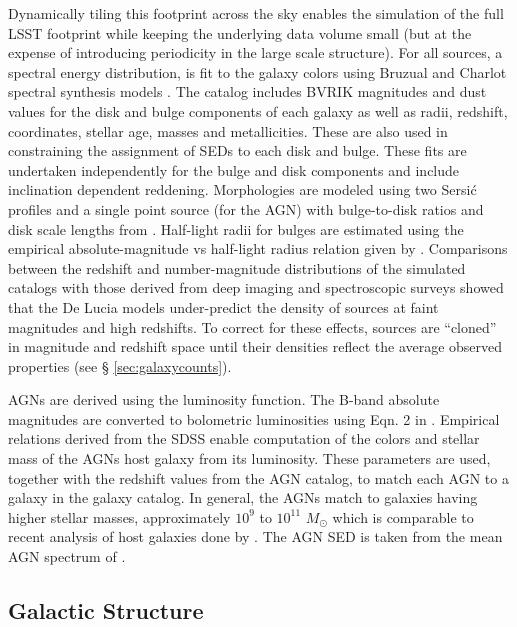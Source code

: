 \documentclass[]{article}
\begin{document}
Dynamically tiling this footprint across the sky enables the
simulation of the full LSST footprint while keeping the underlying
data volume small (but at the expense of introducing periodicity in
the large scale structure).  For all sources, a spectral energy
distribution, is fit to the galaxy colors using Bruzual and Charlot
spectral synthesis models \citep{bruzual}. The
\citet{delucia} catalog includes BVRIK magnitudes and dust values for
the disk and bulge components of each galaxy as well as radii,
redshift, coordinates, stellar age, masses and metallicities. These
are also used in constraining the assignment of SEDs to each disk and bulge.
These fits are undertaken independently for the bulge and disk components and
include inclination dependent reddening. Morphologies are modeled using two
Sersi{\'c} profiles and a single point source (for the AGN) with
bulge-to-disk ratios and disk scale lengths from \citet{delucia}.
 Half-light radii for bulges are estimated using the empirical
absolute-magnitude vs half-light radius relation given by 
\citet{gonzalez09}.  Comparisons between the redshift and
number-magnitude distributions of the simulated catalogs with those
derived from deep imaging and spectroscopic surveys showed that the De
Lucia models under-predict the density of sources at faint magnitudes
and high redshifts. To correct for these effects, sources are
``cloned'' in magnitude and redshift space until their densities
reflect the average observed properties (see \S
\ref{sec:galaxycounts}). 

AGNs are derived using the \citet{bongiorno12} luminosity
function. The B-band absolute magnitudes are converted to bolometric
luminosities using Eqn. 2 in \citet{hopkins07}. Empirical relations
derived from the SDSS enable computation of the colors and stellar
mass of the AGNs host galaxy from its luminosity. These parameters are
used, together with the redshift values from the AGN catalog, to match
each AGN to a galaxy in the galaxy catalog. In general, the AGNs match
to galaxies having higher stellar masses, approximately $10^{9}$ to
$10^{11}$ $M_{\odot}$ which is comparable to recent analysis of host
galaxies done by \citet{xue11}. The AGN SED is taken from the mean AGN
spectrum of \citet{vandenberk}.

\subsection{Galactic Structure \label{sec:stars}}
\end{document}
